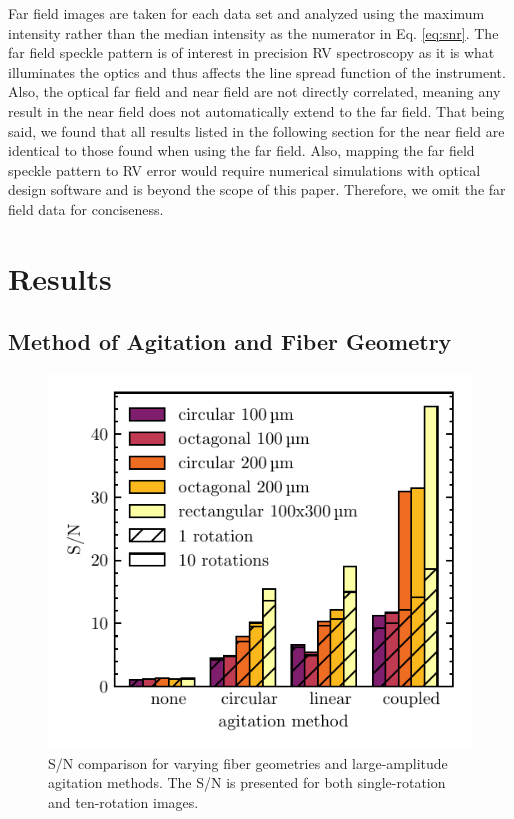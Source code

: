 \documentclass[twocolumn]{emulateapj}
\begin{document}
Far field images are taken for each data set and analyzed using the maximum intensity rather than the median intensity as the numerator in Eq. \ref{eq:snr}. The far field speckle pattern is of interest in precision RV spectroscopy as it is what illuminates the optics and thus affects the line spread function of the instrument. Also, the optical far field and near field are not directly correlated, meaning any result in the near field does not automatically extend to the far field. That being said, we found that all results listed in the following section for the near field are identical to those found when using the far field. Also, mapping the far field speckle pattern to RV error would require numerical simulations with optical design software and is beyond the scope of this paper. Therefore, we omit the far field data for conciseness.

\section{Results}
\label{sec:results}

\subsection{Method of Agitation and Fiber Geometry}
\label{subsec:ag_snr}

\begin{figure}
\centering
	\includegraphics[width=\columnwidth]{images/ag_snr.pdf}
	\caption{S/N comparison for varying fiber geometries and large-amplitude agitation methods. The S/N is presented for both single-rotation and ten-rotation images.}
\label{fig:ag_snr}
\end{figure}
\end{document}

